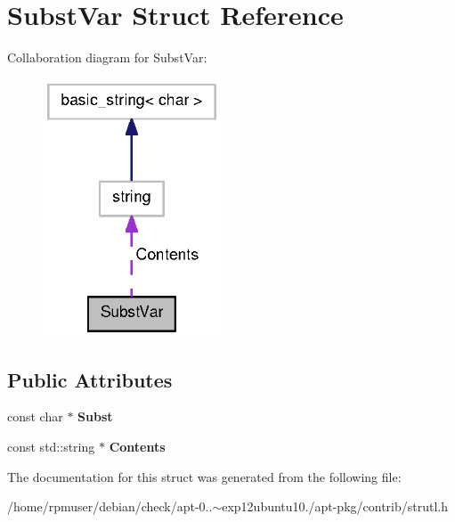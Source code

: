 \section{\-Subst\-Var \-Struct \-Reference}
\label{structSubstVar}


\-Collaboration diagram for \-Subst\-Var\-:
\nopagebreak
\begin{figure}[H]
\begin{center}
\leavevmode
\includegraphics[width=150pt]{structSubstVar__coll__graph}
\end{center}
\end{figure}
\subsection*{\-Public \-Attributes}
\begin{DoxyCompactItemize}
\item 
const char $\ast$ {\bfseries \-Subst}\label{structSubstVar_a40e724aee0fab212ead4d4cd0f48c48d}

\item 
const std\-::string $\ast$ {\bfseries \-Contents}\label{structSubstVar_a0f45045c029c8827abecb292b59e7698}

\end{DoxyCompactItemize}


\-The documentation for this struct was generated from the following file\-:\begin{DoxyCompactItemize}
\item 
/home/rpmuser/debian/check/apt-\/0..$\sim$exp12ubuntu10./apt-\/pkg/contrib/strutl.\-h\end{DoxyCompactItemize}
